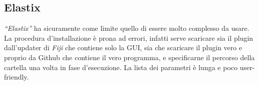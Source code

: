 \subsection{Elastix}
\noindent \textit{``Elastix''} ha sicuramente come limite quello di essere molto complesso da usare. La procedura d'installazione è prona ad errori, infatti serve scaricare sia il plugin dall'updater di \textit{Fiji} che contiene solo la GUI, sia che scaricare il plugin vero e proprio da Github che contiene il vero programma, e specificarne il percorso della cartella una volta in fase d'esecuzione. La lista dei parametri è lunga e poco user-friendly.